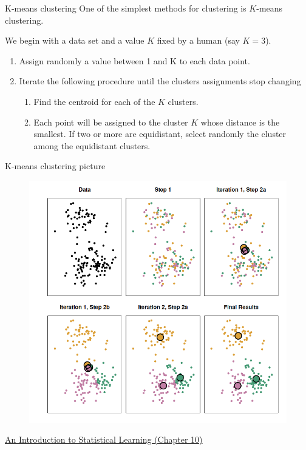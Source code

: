 \documentclass{beamer}
\begin{document}
\begin{frame}{K-means clustering}
One of the simplest methods for clustering is $K$-means clustering. 

We begin with a data set and a value $K$ fixed by a human (say $K=3$). 

\begin{enumerate}
	\item Assign randomly a value between 1 and K to each data point.
	\item Iterate the following procedure until the clusters assignments stop changing 
	\begin{enumerate}
		\item Find the centroid for each of the $K$ clusters.
		\item Each point will be assigned to the cluster $K$ whose distance is the smallest. If two or more are equidistant, select randomly the cluster among the equidistant clusters.
	\end{enumerate}	
\end{enumerate}


\end{frame}

\begin{frame}{K-means clustering picture}
	
	\begin{figure}[h]
		\centering
		\includegraphics[scale=0.55]{../../Figures/kmeans_clustering.png}
	\end{figure}	
	\href{https://www.statlearning.com/}{An Introduction to Statistical Learning (Chapter 10)}
\end{frame}
\end{document}
